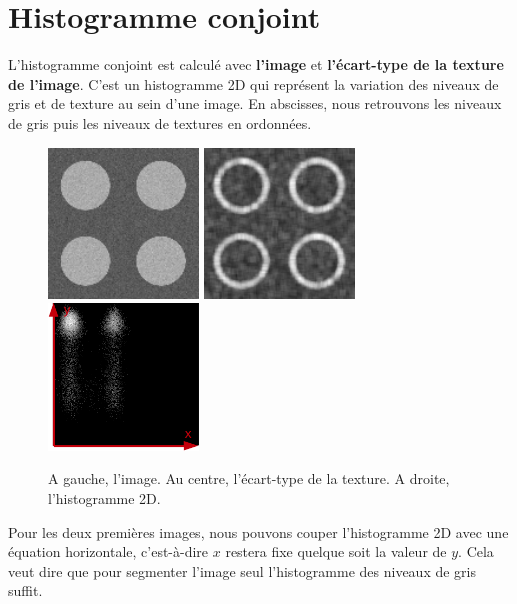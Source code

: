 \documentclass[11pt]{article}
\begin{document}
  \section{Histogramme conjoint}
  
  L'histogramme conjoint est calculé avec \textbf{l'image} et \textbf{l'écart-type de la texture de 
  l'image}. C'est un histogramme 2D qui représent la variation des niveaux de gris et de texture au 
  sein d'une image. En abscisses, nous retrouvons les niveaux de gris puis les niveaux de textures en
  ordonnées.\\
  
  \begin{figure}[H]
    \center
    \includegraphics[width=4cm]{texture-0/texture-0.png}
    \includegraphics[width=4cm]{texture-0/texture-0-5-ecart-type.png}
    \includegraphics[width=4cm]{hist2D.png}
    \caption{\small{A gauche, l'image. Au centre, l'écart-type de la texture. A droite, l'histogramme 2D.}}
  \end{figure}
  
  \newpage
  
  Pour les deux premières images, nous pouvons couper l'histogramme 2D avec une équation horizontale,
  c'est-à-dire $x$ restera fixe quelque soit la valeur de $y$. Cela veut dire que pour segmenter l'image 
  seul l'histogramme des niveaux de gris suffit.
  
\end{document}
